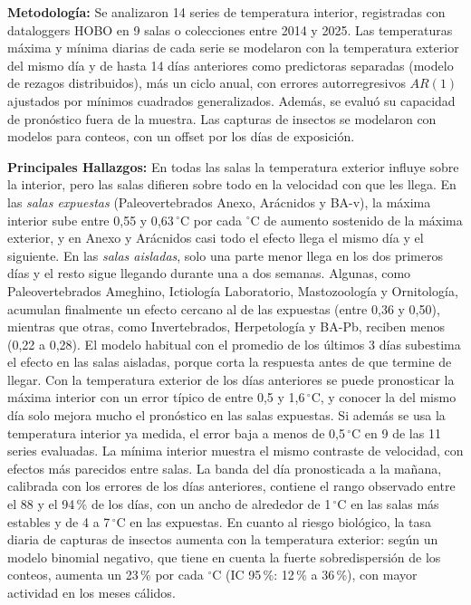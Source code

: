 \documentclass[11pt,a4paper]{article}
\begin{document}
\textbf{Metodología:} Se analizaron 14 series de temperatura interior, registradas con dataloggers HOBO en 9 salas o colecciones entre 2014 y 2025. Las temperaturas máxima y mínima diarias de cada serie se modelaron con la temperatura exterior del mismo día y de hasta 14 días anteriores como predictoras separadas (modelo de rezagos distribuidos), más un ciclo anual, con errores autorregresivos $AR(1)$ ajustados por mínimos cuadrados generalizados. Además, se evaluó su capacidad de pronóstico fuera de la muestra. Las capturas de insectos se modelaron con modelos para conteos, con un offset por los días de exposición.

\textbf{Principales Hallazgos:} En todas las salas la temperatura exterior influye sobre la interior, pero las salas difieren sobre todo en la velocidad con que les llega. En las \textit{salas expuestas} (Paleovertebrados Anexo, Arácnidos y BA-v), la máxima interior sube entre 0{,}55 y 0{,}63\,$^\circ$C por cada $^\circ$C de aumento sostenido de la máxima exterior, y en Anexo y Arácnidos casi todo el efecto llega el mismo día y el siguiente. En las \textit{salas aisladas}, solo una parte menor llega en los dos primeros días y el resto sigue llegando durante una a dos semanas. Algunas, como Paleovertebrados Ameghino, Ictiología Laboratorio, Mastozoología y Ornitología, acumulan finalmente un efecto cercano al de las expuestas (entre 0{,}36 y 0{,}50), mientras que otras, como Invertebrados, Herpetología y BA-Pb, reciben menos (0{,}22 a 0{,}28). El modelo habitual con el promedio de los últimos 3 días subestima el efecto en las salas aisladas, porque corta la respuesta antes de que termine de llegar. Con la temperatura exterior de los días anteriores se puede pronosticar la máxima interior con un error típico de entre 0{,}5 y 1{,}6\,$^\circ$C, y conocer la del mismo día solo mejora mucho el pronóstico en las salas expuestas. Si además se usa la temperatura interior ya medida, el error baja a menos de 0{,}5\,$^\circ$C en 9 de las 11 series evaluadas. La mínima interior muestra el mismo contraste de velocidad, con efectos más parecidos entre salas. La banda del día pronosticada a la mañana, calibrada con los errores de los días anteriores, contiene el rango observado entre el 88 y el 94\,\% de los días, con un ancho de alrededor de 1\,$^\circ$C en las salas más estables y de 4 a 7\,$^\circ$C en las expuestas. En cuanto al riesgo biológico, la tasa diaria de capturas de insectos aumenta con la temperatura exterior: según un modelo binomial negativo, que tiene en cuenta la fuerte sobredispersión de los conteos, aumenta un 23\,\% por cada $^\circ$C (IC 95\,\%: 12\,\% a 36\,\%), con mayor actividad en los meses cálidos.
\end{document}
